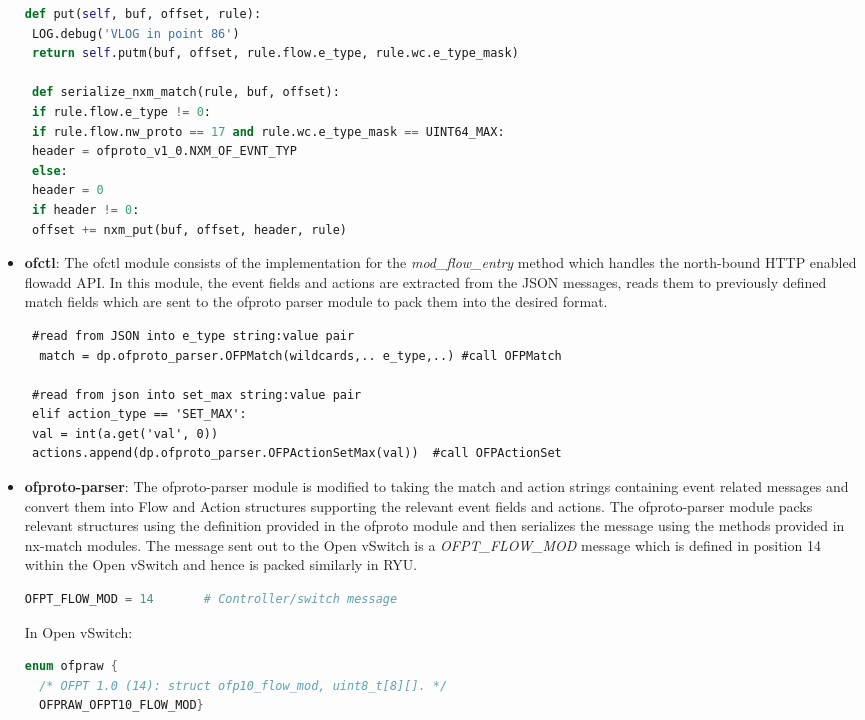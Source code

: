 \begin{itemize}
\begin{lstlisting}[language=python]
 def put(self, buf, offset, rule):
 LOG.debug('VLOG in point 86')
 return self.putm(buf, offset, rule.flow.e_type, rule.wc.e_type_mask)
 
 def serialize_nxm_match(rule, buf, offset):
 if rule.flow.e_type != 0:
 if rule.flow.nw_proto == 17 and rule.wc.e_type_mask == UINT64_MAX:
 header = ofproto_v1_0.NXM_OF_EVNT_TYP
 else:
 header = 0
 if header != 0: 
 offset += nxm_put(buf, offset, header, rule)
 \end{lstlisting}

 \item \textbf{ofctl}: The ofctl module consists of the implementation for the \textit{mod_flow_entry} method which handles the north-bound HTTP enabled flowadd API. In this module, the event fields and actions are extracted from the JSON messages, reads them to previously defined match fields which are sent to the ofproto parser module to pack them into the desired format. \newline
 \begin{lstlisting}
 #read from JSON into e_type string:value pair
  match = dp.ofproto_parser.OFPMatch(wildcards,.. e_type,..) #call OFPMatch
 
 #read from json into set_max string:value pair
 elif action_type == 'SET_MAX':
 val = int(a.get('val', 0))
 actions.append(dp.ofproto_parser.OFPActionSetMax(val))  #call OFPActionSet
 \end{lstlisting}

 \item \textbf{ofproto-parser}: The ofproto-parser module is modified to taking the match and action strings containing event related messages and convert them into Flow and Action structures supporting the relevant event fields and actions. The ofproto-parser module packs relevant structures using the definition provided in the ofproto module and then serializes the message using the methods provided in nx-match modules. The message sent out to the Open vSwitch is a \textit{OFPT_FLOW_MOD} message which is defined in position 14 within the Open vSwitch and hence is packed similarly in RYU. \newline
  \begin{lstlisting}[language=python]
  OFPT_FLOW_MOD = 14       # Controller/switch message
     \end{lstlisting}
     
     In Open vSwitch:
     \begin{lstlisting}[language=c]
  enum ofpraw { 
  /* OFPT 1.0 (14): struct ofp10_flow_mod, uint8_t[8][]. */
  OFPRAW_OFPT10_FLOW_MOD}
  \end{lstlisting}
  

\end{itemize}
